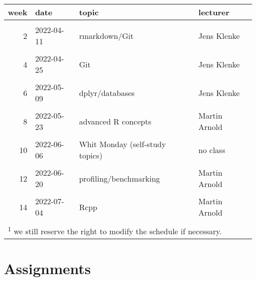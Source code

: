 \documentclass[]{article}
\begin{document}
\begin{table}[!h]
\centering
\begin{tabular}{rlll}
\toprule
week & date & topic & lecturer\\
\midrule
\cellcolor{gray!6}{1} & \cellcolor{gray!6}{2022-04-04} & \cellcolor{gray!6}{introduction} & \cellcolor{gray!6}{Jens Klenke}\\
2 & 2022-04-11 & rmarkdown/Git & Jens Klenke\\
\cellcolor{gray!6}{3} & \cellcolor{gray!6}{2022-04-18} & \cellcolor{gray!6}{Easter Monday (self-study topics)} & \cellcolor{gray!6}{no class}\\
4 & 2022-04-25 & Git & Jens Klenke\\
\cellcolor{gray!6}{5} & \cellcolor{gray!6}{2022-05-02} & \cellcolor{gray!6}{ggplot2} & \cellcolor{gray!6}{Jens Klenke}\\
6 & 2022-05-09 & dplyr/databases & Jens Klenke\\
\cellcolor{gray!6}{7} & \cellcolor{gray!6}{2022-05-16} & \cellcolor{gray!6}{web scraping} & \cellcolor{gray!6}{Jens Klenke}\\
8 & 2022-05-23 & advanced R concepts & Martin Arnold\\
\cellcolor{gray!6}{9} & \cellcolor{gray!6}{2022-05-30} & \cellcolor{gray!6}{functional programming} & \cellcolor{gray!6}{Martin Arnold}\\
10 & 2022-06-06 & Whit Monday  (self-study topics) & no class\\
\cellcolor{gray!6}{11} & \cellcolor{gray!6}{2022-06-13} & \cellcolor{gray!6}{Object oriented programming} & \cellcolor{gray!6}{Martin Arnold}\\
12 & 2022-06-20 & profiling/benchmarking & Martin Arnold\\
\cellcolor{gray!6}{13} & \cellcolor{gray!6}{2022-06-27} & \cellcolor{gray!6}{improving performance} & \cellcolor{gray!6}{Martin Arnold}\\
14 & 2022-07-04 & Rcpp & Martin Arnold\\
\cellcolor{gray!6}{15} & \cellcolor{gray!6}{2022-07-11} & \cellcolor{gray!6}{RcppAramdillo} & \cellcolor{gray!6}{Martin Arnold}\\
\bottomrule
\multicolumn{4}{l}{\textsuperscript{1} we still reserve the right to modify the schedule if necessary.}\\
\end{tabular}
\end{table}

\hypertarget{assignments}{%
\section{Assignments}\label{assignments}}
\end{document}
